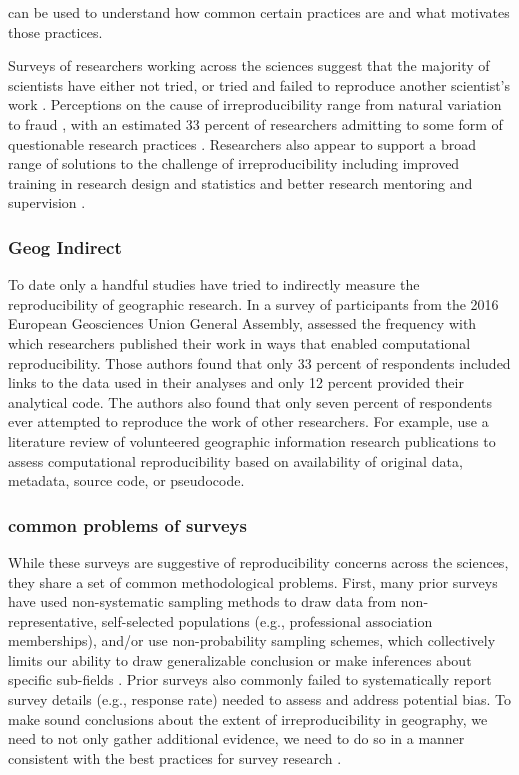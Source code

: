 \documentclass[]{interact}
\theoremstyle{plain}%
\theoremstyle{definition}
\theoremstyle{remark}
\begin{document}
can be used to understand how common certain practices are and what motivates those practices.

Surveys of researchers working across the sciences suggest that the majority of scientists have either not tried, or tried and failed to reproduce another scientist's work \citep{baker20161, boulbes2018survey}. 
Perceptions on the cause of irreproducibility range from natural variation to fraud \citep{ranstam2000fraud, anderson2007normative, baker20161}, with an estimated 33 percent of researchers admitting to some form of questionable research practices \citep{fanelli2009many}.  
Researchers also appear to support a broad range of solutions to the challenge of irreproducibility including improved training in research design and statistics and better research mentoring and supervision \citep{baker20161}. 

\subsubsection{Geog Indirect}
To date only a handful studies have tried to indirectly measure the reproducibility of geographic research.
In a survey of participants from the 2016 European Geosciences Union General Assembly, \citet{konkol2019} assessed the frequency with which researchers published their work in ways that enabled computational reproducibility. 
Those authors found that only 33 percent of respondents included links to the data used in their analyses and only 12 percent provided their analytical code. 
The authors also found that only seven percent of respondents ever attempted to reproduce the work of other researchers.
For example, \citet{ostermann2017} use a literature review of volunteered geographic information research publications to assess computational reproducibility based on availability of original data, metadata, source code, or pseudocode.

\subsubsection{common problems of surveys}
While these surveys are suggestive of reproducibility concerns across the sciences, they share a set of common methodological problems. 
First, many prior surveys have used non-systematic sampling methods to draw data from non-representative, self-selected populations (e.g., professional association memberships), and/or use non-probability sampling schemes, which collectively limits our ability to draw generalizable conclusion or make inferences about specific sub-fields \citep{NASEM2019}.
Prior surveys also commonly failed to systematically report survey details (e.g., response rate) needed to assess and address potential bias. 
To make sound conclusions about the extent of irreproducibility in geography, we need to not only gather additional evidence, we need to do so in a manner consistent with the best practices for survey research \citep[see][]{dillman2014internet, aapor}.
\end{document}

